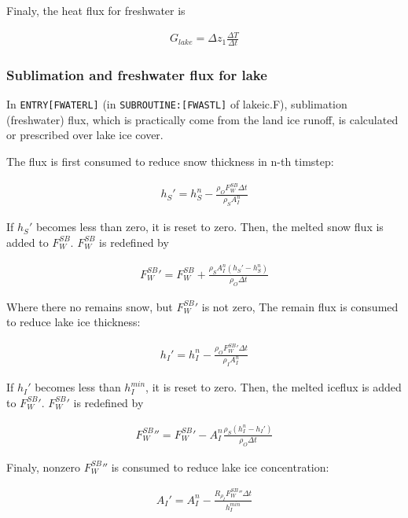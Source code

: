 Finaly, the heat flux for freshwater is

\begin{eqnarray}
    G_{lake} = \Delta z_1 \frac{\Delta T }{\Delta t}
\end{eqnarray}

\hypertarget{sublimation-and-freshwater-flux-for-lake}{%
\subsubsection{Sublimation and freshwater flux for
lake}\label{sublimation-and-freshwater-flux-for-lake}}

In \texttt{ENTRY{[}FWATERL{]}} (in \texttt{SUBROUTINE:{[}FWASTL{]}} of
lakeic.F), sublimation (freshwater) flux, which is practically come from
the land ice runoff, is calculated or prescribed over lake ice cover.

The flux is first consumed to reduce snow thickness in n-th timstep:

\begin{eqnarray}
    h_S' = h_S^n -  \frac{\rho_O  F_W^{SB}\Delta t}{\rho_S A_I^n}
\end{eqnarray}

If \(h_S'\) becomes less than zero, it is reset to zero. Then, the
melted snow flux is added to \(F_W^{SB}\). \(F_W^{SB}\) is redefined by

\begin{eqnarray}
    F_W^{SB}{'} = F_W^{SB} + \frac{\rho_S A_I^n (h_S' - h_S^n)}{\rho_O\Delta t}
\end{eqnarray}

Where there no remains snow, but \(F_W^{SB}{'}\) is not zero, The remain
flux is consumed to reduce lake ice thickness:

\begin{eqnarray}
    h_I' = h_I^n - \frac{\rho_O F_W^{SB}{'} \Delta t }{\rho_I A_I^n}
\end{eqnarray}

If \(h_I'\) becomes less than \(h_I^{min}\), it is reset to zero. Then,
the melted iceflux is added to \(F_W^{SB}{'}\). \(F_W^{SB}{'}\) is
redefined by

\begin{eqnarray}
    F_W^{SB}{''} = F_W^{SB}{'} - A_I^n \frac{\rho_S (h_I^n-h_I')}{\rho_O\Delta t}
\end{eqnarray}

Finaly, nonzero \(F_W^{SB}{''}\) is consumed to reduce lake ice
concentration:

\begin{eqnarray}
    A_I' = A_I^n - \frac{R_{\rho_I}F_W^{SB}{''} \Delta t }{h_I^{min}}
\end{eqnarray}

